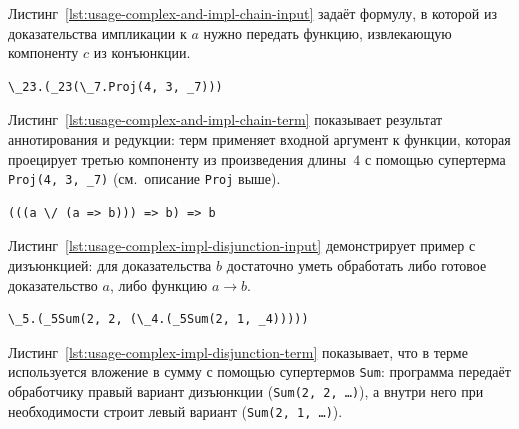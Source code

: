 \documentclass[14pt, russian]{scrartcl}
\begin{document}
Листинг~\ref{lst:usage-complex-and-impl-chain-input} задаёт формулу, в которой из
доказательства импликации к $a$ нужно передать функцию, извлекающую компоненту
$c$ из конъюнкции.

\begin{listing}[!htb]
\caption{Редуцированный терм для \texttt{complex-and-impl-chain.txt}}
\label{lst:usage-complex-and-impl-chain-term}
\begin{verbatim}
\_23.(_23(\_7.Proj(4, 3, _7)))
\end{verbatim}
\end{listing}

Листинг~\ref{lst:usage-complex-and-impl-chain-term} показывает результат
аннотирования и редукции: терм применяет входной аргумент к функции, которая
проецирует третью компоненту из произведения длины~$4$ с помощью супертерма
\texttt{Proj(4, 3, \_7)} (см.~описание \texttt{Proj} выше).

\begin{listing}[!htb]
\caption{Входная формула \texttt{complex-impl-disjunction.txt}}
\label{lst:usage-complex-impl-disjunction-input}
\begin{verbatim}
(((a \/ (a => b))) => b) => b
\end{verbatim}
\end{listing}

Листинг~\ref{lst:usage-complex-impl-disjunction-input} демонстрирует пример с
дизъюнкцией: для доказательства $b$ достаточно уметь обработать либо готовое
доказательство $a$, либо функцию $a \rightarrow b$.

\begin{listing}[!htb]
\caption{Редуцированный терм для \texttt{complex-impl-disjunction.txt}}
\label{lst:usage-complex-impl-disjunction-term}
\begin{verbatim}
\_5.(_5Sum(2, 2, (\_4.(_5Sum(2, 1, _4)))))
\end{verbatim}
\end{listing}

Листинг~\ref{lst:usage-complex-impl-disjunction-term} показывает, что в терме
используется вложение в сумму с помощью супертермов \texttt{Sum}: программа
передаёт обработчику правый вариант дизъюнкции (\texttt{Sum(2, 2, \ldots)}),
а внутри него при необходимости строит левый вариант (\texttt{Sum(2, 1, \ldots)}).
\end{document}
